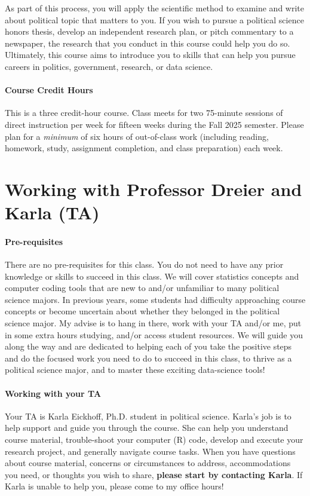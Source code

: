 \documentclass[11pt]{article}
\begin{document}
\noindent

\noindent As part of this process, you will apply the scientific method to examine and write about political topic that matters to you.
If you wish to pursue a political science honors thesis, develop an independent research plan, or pitch commentary to a newspaper, the research that you conduct in this course could help you do so. Ultimately, this course aims to introduce you to skills that can help you pursue careers in politics, government, research, or data science.

\vspace{-5pt}
\paragraph{Course Credit Hours} This is a three credit-hour course. Class meets for two 75-minute sessions of direct instruction per week for fifteen weeks during the Fall 2025 semester. Please plan for a \textit{minimum} of six hours of out-of-class work (including reading, homework, study, assignment completion, and class preparation) each week.

\section*{Working with Professor Dreier and Karla (TA)}

\paragraph{Pre-requisites} There are no pre-requisites for this class. You do not need to have any prior knowledge or skills to succeed in this class. We will cover statistics concepts and computer coding tools that are new to and/or unfamiliar to many political science majors. In previous years, some students had difficulty approaching course concepts or become uncertain about whether they belonged in the political science major. My advise is to hang in there, work with your TA and/or me, put in some extra hours studying, and/or access student resources. We will guide you along the way and are dedicated to helping each of you take the positive steps and do the focused work you need to do to succeed in this class, to thrive as a political science major, and to master these exciting data-science tools!

\paragraph{Working with your TA} Your TA is Karla Eickhoff, Ph.D. student in political science. Karla's job is to help support and guide you through the course. She can help you understand course material, trouble-shoot your computer (R) code, develop and execute your research project, and generally navigate course tasks. When you have questions about course material, concerns or circumstances to address, accommodations you need, or thoughts you wish to share, \textbf{please start by contacting Karla}. If Karla is unable to help you, please come to my office hours!
\end{document}

